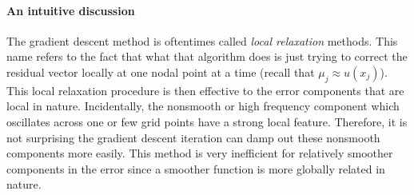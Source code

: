 
\paragraph{An intuitive discussion} 
The gradient descent method is oftentimes called {\it local relaxation}
methods. This name refers to the fact that what that
algorithm does is just trying to correct the residual vector locally
at one nodal point at a time (recall that $\mu_j\approx u(x_j)$).
This local relaxation procedure is then effective to the error
components that are local in nature.  Incidentally, the nonsmooth or
high frequency component which oscillates across one or few grid
points have a strong local feature.  Therefore, it is not surprising the
 gradient descent  iteration can damp out these
nonsmooth components more easily.  This method is very inefficient
for relatively smoother components in the error since a smoother
function is more globally related in nature.

